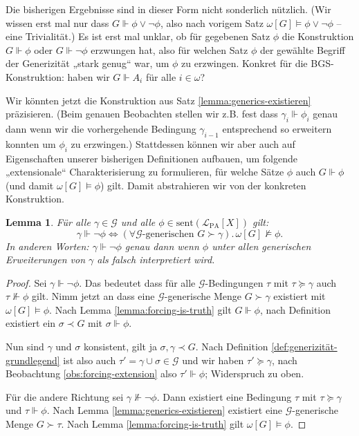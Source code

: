 \documentclass[nofonts]{uebung}
\newtheorem{lemma}[theorem]{Lemma}
\theoremstyle{definition}
\begin{document}
Die bisherigen Ergebnisse sind in dieser Form nicht sonderlich nützlich. (Wir wissen erst mal nur dass $G\Vdash \phi\lor\neg\phi$, also nach vorigem Satz $\omega[G] \vDash \phi\lor\neg\phi$ -- eine Trivialität.)
Es ist erst mal unklar, ob für gegebenen Satz $\phi$ die Konstruktion $G\Vdash \phi$ oder $G\Vdash\neg\phi$ erzwungen hat, also für welchen Satz $\phi$ der gewählte Begriff der Generizität „stark genug“ war, um $\phi$ zu erzwingen.  Konkret für die BGS-Konstruktion: haben wir $G\Vdash A_i$ für alle $i\in\omega$?

Wir könnten jetzt die Konstruktion aus Satz \ref{lemma:generics-existieren} präzisieren. (Beim genauen Beobachten stellen wir z.B. fest dass $\gamma_i\Vdash\phi_i$ genau dann wenn wir die vorhergehende Bedingung $\gamma_{i-1}$ entsprechend so erweitern konnten um $\phi_i$ zu erzwingen.)
Stattdessen können wir aber auch auf Eigenschaften unserer bisherigen Definitionen aufbauen, um folgende „extensionale“ Charakterisierung zu formulieren, für welche Sätze $\phi$ auch $G\Vdash \phi$ (und damit $\omega[G]\vDash\phi$) gilt. Damit abstrahieren wir von der konkreten Konstruktion.


\begin{lemma}\label{lemma:single-negation-contradicts}
    Für alle $\gamma\in\mathcal G$ und alle $\phi\in \mathrm{sent}(\mathcal L_{\mathrm{PA}}[X])$ gilt:
    \[ \gamma\Vdash\neg\phi \iff (\forall\text{$\mathcal G$-generischen $G\succ\gamma$}).\, \omega[G]\not\vDash \phi. \]
    In anderen Worten: $\gamma\Vdash\neg\phi$ genau dann wenn $\phi$ unter allen generischen Erweiterungen von $\gamma$ als falsch interpretiert wird.
\end{lemma}
\begin{proof}
    Sei $\gamma\Vdash\neg\phi$. Das bedeutet dass für alle $\mathcal G$-Bedingungen $\tau$ mit $\tau\succeq\gamma$ auch $\tau\not\Vdash \phi$ gilt.
    Nimm jetzt an dass eine $\mathcal G$-generische Menge $G\succ\gamma$ existiert mit $\omega[G]\vDash\phi$.
    Nach Lemma \ref{lemma:forcing-is-truth} gilt $G\Vdash\phi$, nach Definition existiert ein $\sigma\prec G$ mit $\sigma\Vdash\phi$.

    Nun sind $\gamma$ und $\sigma$ konsistent, gilt ja $\sigma,\gamma\prec G$.
    Nach Definition \ref{def:generizität-grundlegend} ist also auch $\tau'=\gamma\cup\sigma\in\mathcal G$ und wir haben $\tau'\succeq\gamma$, nach Beobachtung \ref{obs:forcing-extension} also $\tau'\Vdash\phi$; Widerspruch zu oben.

    Für die andere Richtung sei $\gamma\not\Vdash\neg\phi$. Dann existiert eine Bedingung $\tau$ mit $\tau\succeq\gamma$ und $\tau\Vdash\phi$.
    Nach Lemma \ref{lemma:generics-existieren} existiert eine $\mathcal G$-generische Menge $G\succ \tau$. Nach Lemma \ref{lemma:forcing-is-truth} gilt $\omega[G]\vDash\phi$.
\end{proof}
\end{document}
